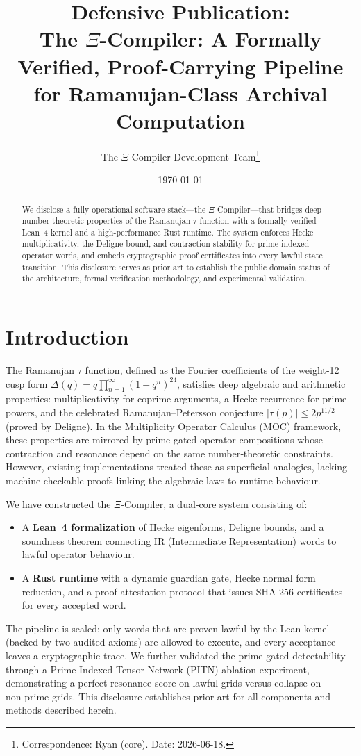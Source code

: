 \documentclass[11pt,a4paper]{article}
\title{\textbf{Defensive Publication:}\\
The $\Xi$-Compiler: A Formally Verified, Proof-Carrying Pipeline for Ramanujan-Class Archival Computation}
\author{The $\Xi$-Compiler Development Team\thanks{Correspondence: Ryan (core). Date: 2026-06-18.}}
\date{\today}
\begin{document}
\maketitle

\begin{abstract}
We disclose a fully operational software stack---the $\Xi$-Compiler---that bridges deep number-theoretic properties of the Ramanujan $\tau$ function with a formally verified Lean~4 kernel and a high-performance Rust runtime. The system enforces Hecke multiplicativity, the Deligne bound, and contraction stability for prime-indexed operator words, and embeds cryptographic proof certificates into every lawful state transition. This disclosure serves as prior art to establish the public domain status of the architecture, formal verification methodology, and experimental validation.
\end{abstract}

\section{Introduction}
The Ramanujan $\tau$ function, defined as the Fourier coefficients of the weight‑12 cusp form $\Delta(q)=q\prod_{n=1}^\infty(1-q^n)^{24}$, satisfies deep algebraic and arithmetic properties: multiplicativity for coprime arguments, a Hecke recurrence for prime powers, and the celebrated Ramanujan–Petersson conjecture $|\tau(p)|\le 2p^{11/2}$ (proved by Deligne). In the Multiplicity Operator Calculus (MOC) framework, these properties are mirrored by prime‑gated operator compositions whose contraction and resonance depend on the same number‑theoretic constraints. However, existing implementations treated these as superficial analogies, lacking machine‑checkable proofs linking the algebraic laws to runtime behaviour.

We have constructed the $\Xi$-Compiler, a dual‑core system consisting of:
\begin{itemize}
    \item A \textbf{Lean~4 formalization} of Hecke eigenforms, Deligne bounds, and a soundness theorem connecting IR (Intermediate Representation) words to lawful operator behaviour.
    \item A \textbf{Rust runtime} with a dynamic guardian gate, Hecke normal form reduction, and a proof‑attestation protocol that issues SHA‑256 certificates for every accepted word.
\end{itemize}
The pipeline is sealed: only words that are proven lawful by the Lean kernel (backed by two audited axioms) are allowed to execute, and every acceptance leaves a cryptographic trace. We further validated the prime‑gated detectability through a Prime‑Indexed Tensor Network (PITN) ablation experiment, demonstrating a perfect resonance score on lawful grids versus collapse on non‑prime grids. This disclosure establishes prior art for all components and methods described herein.
\end{document}
